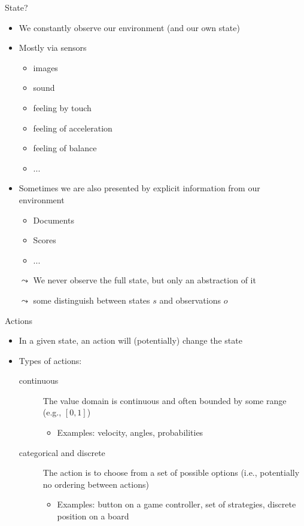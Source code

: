 \begin{frame}[c]{State?}
	
	\begin{itemize}
		\item We constantly observe our environment (and our own state)
		\item Mostly via sensors
		\begin{itemize}
			\item images
			\item sound
			\item feeling by touch
			\item feeling of acceleration
			\item feeling of balance
			\item ...
		\end{itemize}
		\pause
		\smallskip
		\item Sometimes we are also presented by explicit information from our environment
		\begin{itemize}
			\item Documents
			\item Scores
			\item ...
		\end{itemize}
		\pause
		\smallskip
		\item[$\leadsto$] We never observe the full state, but only an abstraction of it
		\item[$\leadsto$] some distinguish between states $s$ and observations $o$
	\end{itemize}
	
	
\end{frame}
\begin{frame}[c]{Actions}
	
	\begin{itemize}
		\item In a given state, an action will (potentially) change the state 
		\medskip
		\pause
		\item Types of actions:
		\begin{description}
			\item[continuous] The value domain is continuous and often bounded by some range (e.g., $[0,1]$)
			\begin{itemize}
				\item Examples: velocity, angles, probabilities
			\end{itemize}
			\pause
			\item[categorical and discrete] The action is to choose from a set of possible options (i.e., potentially no ordering between actions)
			\begin{itemize}
				\item Examples: button on a game controller, set of strategies, discrete position on a board
			\end{itemize}
		\end{description}
	\end{itemize}
	
\end{frame}

